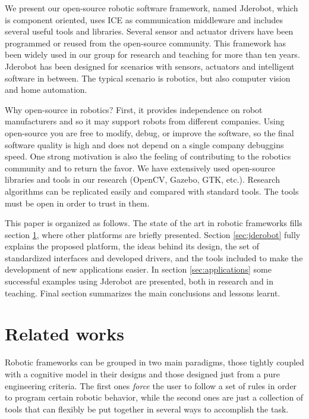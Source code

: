 \documentclass[twocolumn]{svjour3}          %
\begin{document}
We present our open-source robotic software framework, named Jderobot, which is component oriented, uses ICE as communication middleware and includes several useful tools and libraries. Several sensor and actuator drivers have been programmed or reused from the open-source community. This framework has been widely used in our group for research and teaching for more than ten years. Jderobot has been designed for scenarios with sensors, actuators and intelligent software in between. The typical scenario is robotics, but also computer vision and home automation.

Why open-source in robotics? First, it provides independence on robot manufacturers and so it may support robots from different companies. Using open-source you are free to modify, debug, or improve the software, so the final software quality is high and does not depend on a single company debuggins speed. One strong motivation is also the feeling of contributing to the robotics community and to return the favor. We have extensively used open-source libraries and tools in our research (OpenCV, Gazebo, GTK, etc.). Research algorithms can be replicated easily and compared with standard tools. The tools must be open in order to trust in them.

This paper is organized as follows. The state of the art in robotic frameworks fills section \ref{sec:relatedworks}, where other platforms are briefly presented. Section \ref{sec:jderobot} fully explains the proposed platform, the ideas behind its design, the set of standardized interfaces and developed drivers, and the tools included to make the development of new applications easier. In section \ref{sec:applications} some successful examples using Jderobot are presented, both in research and in teaching. Final section summarizes the main conclusions and lessons learnt.

\section{Related works}
\label{sec:relatedworks}

Robotic frameworks can be grouped in two main paradigms, those tightly
coupled with a cognitive model in their designs and those designed
just from a pure engineering criteria. The first ones \textit{force}
the user to follow a set of rules in order to program certain robotic
behavior, while the second ones are just a collection of tools that
can flexibly be put together in several ways to accomplish the task.
\end{document}
